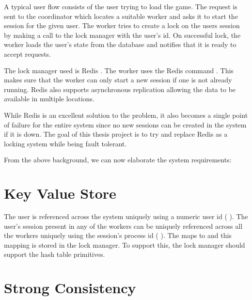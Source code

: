 A typical user flow consists of the user trying to load the game. The request
is sent to the coordinator which locates a suitable worker and asks it to
start the session for the given user. The worker tries to create a lock on
the users session by making a call to the lock manager with the user's id.
On successful lock, the worker loads the user's state from the database and
notifies that it is ready to accept requests.

The lock manager used is Redis \citep{redis}%
. The worker uses the Redis command %
. This makes sure that the worker can only start a new session if one is
not already running. Redis also supports asynchronous replication allowing the
data to be available in multiple locations.

While Redis is an excellent solution to the problem, it also becomes a single
point of failure for the entire system since no new sessions can be created in
the system if it is down. The goal of this thesis project is to try and replace
Redis as a locking system while being fault tolerant.

From the above background, we can now elaborate the system requirements:

\section{Key Value Store}
\label{section:ml.kv.store}


The user is referenced across the system uniquely using a numeric user id
(%
). The user's session present in any of the workers can be uniquely 
referenced across all the workers uniquely using the session's process id
(%
).
The  maps to  and this mapping is stored in the lock
manager. To support this, the lock manager should support the hash
table primitives.

\section{Strong Consistency}

